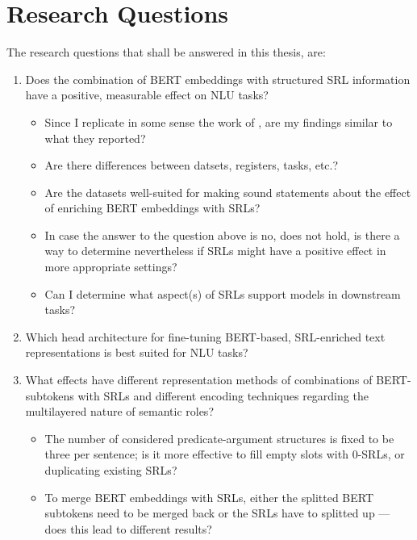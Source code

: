 \section{Research Questions}

The research questions that shall be answered in this thesis, are:

\begin{enumerate}
  \item \label{ques:one} Does the combination of  BERT embeddings with structured SRL information have a positive,
                         measurable effect on NLU tasks?
    \begin{itemize}
      \item Since I replicate in some sense the work of \cite{zhang2019semantics}, are my findings similar to what they reported?
      \item Are there differences between datsets, registers, tasks, etc.?
      \item Are the datasets well-suited for making sound statements about the effect of enriching BERT embeddings with SRLs?
      \item In case the answer to the question above is no, does not hold, is there a way to determine nevertheless if SRLs might have a positive effect in more appropriate settings?
      \item Can I determine what aspect(s) of SRLs support models in downstream tasks?
    \end{itemize}
  \item \label{ques:two} Which head architecture for fine-tuning BERT-based, SRL-enriched text representations is best suited for
                          NLU tasks?
  \item \label{ques:three} What effects have different representation methods of combinations of BERT-subtokens with SRLs and different encoding techniques regarding the multilayered nature of semantic roles?
    \begin{itemize}
      \item The number of considered predicate-argument
            structures is fixed to be three per sentence; is it more effective to fill empty slots with
            0-SRLs, or duplicating existing SRLs?
      \item To merge BERT embeddings with SRLs, either
            the splitted BERT subtokens need to be merged back or the SRLs have to splitted up --- does
            this lead to different results?
    \end{itemize}

\end{enumerate}



